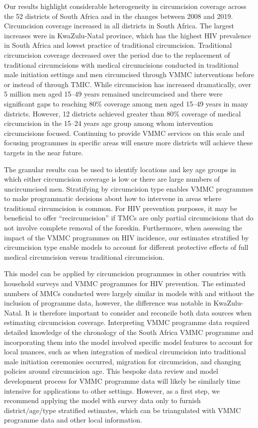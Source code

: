 \documentclass{article}
\begin{document}
Our results highlight considerable heterogeneity in circumcision coverage across the 52 districts of South Africa and in the changes between 2008 and 2019. Circumcision coverage increased in all districts in South Africa. The largest increases were in KwaZulu-Natal province, which has the highest HIV prevalence in South Africa and lowest practice of traditional circumcision. Traditional circumcision coverage decreased over the period due to the replacement of traditional circumcisions with medical circumcisions conducted in traditional male initiation settings and men circumcised through VMMC interventions before or instead of through TMIC. While circumcision has increased dramatically, over 5 million men aged 15--49 years remained uncircumcised and there were significant gaps to reaching 80\% coverage among men aged 15--49 years in many districts. However, 12 districts achieved greater than 80\% coverage of medical circumcision in the 15--24 years age group among whom intervention circumcisions focused. Continuing to provide VMMC services on this scale and focusing programmes in specific areas will ensure more districts will achieve these targets in the near future. 

The granular results can be used to identify locations and key age groups in which either circumcision coverage is low or there are large numbers of uncircumcised men. Stratifying by circumcision type enables VMMC programmes to make programmatic decisions about how to intervene in areas where traditional circumcision is common. For HIV prevention purposes, it may be beneficial to offer ``recircumcision'' if TMCs are only partial circumcisions that do not involve complete removal of the foreskin. Furthermore, when assessing the impact of the VMMC programmes on HIV incidence, our estimates stratified by circumcision type enable models to account for different protective effects of full medical circumcision versus traditional circumcision.

This model can be applied by circumcision programmes in other countries with household surveys and VMMC programmes for HIV prevention. The estimated numbers of MMCs conducted were largely similar in models with and without the inclusion of programme data, however, the difference was notable in KwaZulu-Natal. It is therefore important to consider and reconcile both data sources when estimating circumcision coverage. Interpreting VMMC programme data required detailed knowledge of the chronology of the South Africa VMMC programme and incorporating them into the model involved specific model features to account for local nuances, such as when integration of medical circumcision into traditional male initiation ceremonies occurred, migration for circumcision, and changing policies around circumcision age. This bespoke data review and model development process for VMMC programme data will likely be similarly time intensive for applications to other settings. However, as a first step, we recommend applying the model with survey data only to furnish district/age/type stratified estimates, which can be triangulated with VMMC programme data and other local information. 
\end{document}

